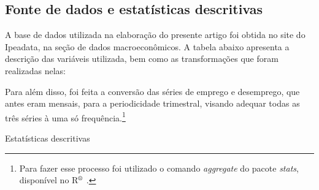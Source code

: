 \documentclass[12pt, openright,oneside, a4paper, english, brazil, section = TITLE, ubsection = Title]{article}
\begin{document}
\subsection{Fonte de dados e estatísticas descritivas}

A base de dados utilizada na elaboração do presente artigo foi obtida no site do Ipeadata, na seção de dados macroeconômicos. A tabela abaixo apresenta a descrição das variáveis utilizada, bem como as transformações que foram realizadas nelas: 

\begin{table}[H]
\centering
\caption{Descrição das  variáveis}
\label{tab:dados}
\end{table}

Para além disso, foi feita a conversão das séries de emprego e desemprego, que antes eram mensais, para a periodicidade trimestral, visando adequar todas as três séries à uma só frequência.\footnote{Para fazer esse processo foi utilizado o comando \textit{aggregate} do pacote \textit{stats}, disponível no R$^{\text{\textregistered}}$ \cite{R2020}.}

\begin{table}[H]
\centering
\caption{Estatísticas descritivas}
\label{tab:estatisticas_descritivas}
\caption*{\\ Fonte: Elaboração própria baseada nos dados disponíveis em \cite{IPEA2020}.}
\end{table}
\end{document}
